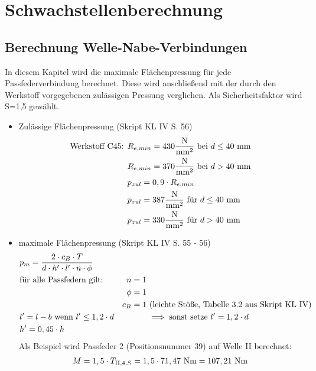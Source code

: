 \chapter{Schwachstellenberechnung}
\section{Berechnung Welle-Nabe-Verbindungen}
In diesem Kapitel wird die maximale Flächenpressung für jede Passfederverbindung berechnet. Diese wird anschließend mit der durch den Werkstoff vorgegebenen zulässigen Pressung verglichen. Als Sicherheitsfaktor wird S=1,5 gewählt.\\
\begin{itemize}
	\item Zulässige Flächenpressung \hfill  (Skript KL IV S. 56)
	\begin{align*}
		\text{Werkstoff C45: } &R_{e,min} = 430 \frac{\text{N}}{\text{mm}^2} \text{ bei } d\le 40 \text{ mm} \\
		 &R_{e,min} = 370 \frac{\text{N}}{\text{mm}^2} \text{ bei } d> 40 \text{ mm} \\
		 &p_{zul} = 0,9 \cdot R_{e,min}  \\
		 &p_{zul} = 387 \frac{\text{N}}{\text{mm}^2} \text{ für } d\le 40 \text{ mm} \\
		  &p_{zul} = 330 \frac{\text{N}}{\text{mm}^2} \text{ für } d> 40 \text{ mm} \\
	\end{align*}
	\item maximale Flächenpressung \hfill (Skript KL IV S. 55 - 56)
	\begin{align*}
		&p_m = \frac{2 \cdot c_B \cdot T}{d \cdot h' \cdot l' \cdot n \cdot \phi} && \\
		&\text{für alle Passfedern gilt: } &n=1 & \\
		& &\phi = 1& \\
		& &c_B = 1 &\text{ (leichte Stöße, Tabelle 3.2 aus Skript KL IV)}\\
		& l' = l - b \text{ wenn } l'\le 1,2 \cdot d &&\implies \text{sonst setze } l' = 1,2 \cdot d \\
		&h' = 0,45 \cdot h &&\\
	\end{align*}
	Als Beispiel wird Passfeder 2 (Positionsnummer 39) auf Welle II berechnet:
	\begin{align*}
		&M= 1,5 \x T_{\mathord{\mathrm{II}},4,S} = 1,5 \x  71,47\text{ Nm} = 107,21 \text{ Nm} \\

\end{align*}
\end{itemize}

